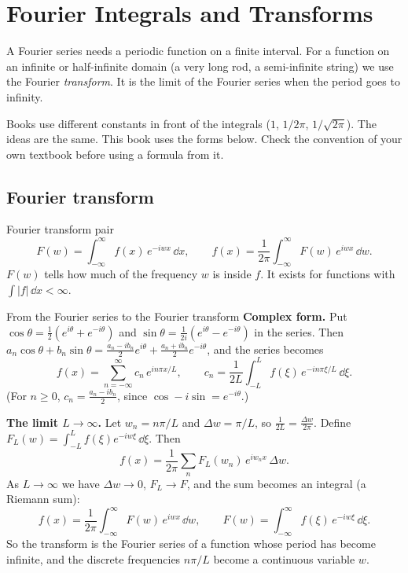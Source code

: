 \chapter{Fourier Integrals and Transforms}

A Fourier series needs a periodic function on a finite interval. For a function on an infinite or half-infinite domain (a very long rod, a semi-infinite string) we use the Fourier \emph{transform}. It is the limit of the Fourier series when the period goes to infinity.

\begin{notebox}
Books use different constants in front of the integrals ($1$, $1/2\pi$, $1/\sqrt{2\pi}$). The ideas are the same. This book uses the forms below. Check the convention of your own textbook before using a formula from it.
\end{notebox}

\section{Fourier transform}

\begin{defbox}{Fourier transform pair}
\[ F(w) = \int_{-\infty}^{\infty}f(x)\,e^{-iwx}\,\dd x, \qquad f(x) = \frac{1}{2\pi}\int_{-\infty}^{\infty}F(w)\,e^{iwx}\,\dd w. \]
$F(w)$ tells how much of the frequency $w$ is inside $f$. It exists for functions with $\int|f|\,\dd x<\infty$.
\end{defbox}

\begin{derivbox}{From the Fourier series to the Fourier transform}
\textbf{Complex form.} Put $\cos\theta = \frac12(e^{i\theta}+e^{-i\theta})$ and $\sin\theta = \frac1{2i}(e^{i\theta}-e^{-i\theta})$ in the series. Then $a_n\cos\theta + b_n\sin\theta = \frac{a_n - ib_n}{2}e^{i\theta} + \frac{a_n+ib_n}{2}e^{-i\theta}$, and the series becomes
\[ f(x) = \sum_{n=-\infty}^{\infty}c_n\,e^{in\pi x/L},\qquad c_n = \frac1{2L}\int_{-L}^{L}f(\xi)\,e^{-in\pi\xi/L}\,\dd\xi . \]
(For $n\ge0$, $c_n = \frac{a_n - ib_n}{2}$, since $\cos - i\sin = e^{-i\theta}$.)

\textbf{The limit $L\to\infty$.} Let $w_n = n\pi/L$ and $\Delta w = \pi/L$, so $\frac1{2L} = \frac{\Delta w}{2\pi}$. Define $F_L(w) = \int_{-L}^{L}f(\xi)e^{-iw\xi}\,\dd\xi$. Then
\[ f(x) = \frac1{2\pi}\sum_{n}F_L(w_n)\,e^{iw_nx}\,\Delta w . \]
As $L\to\infty$ we have $\Delta w\to0$, $F_L\to F$, and the sum becomes an integral (a Riemann sum):
\[ f(x) = \frac1{2\pi}\int_{-\infty}^{\infty}F(w)\,e^{iwx}\,\dd w,\qquad F(w) = \int_{-\infty}^{\infty}f(\xi)\,e^{-iw\xi}\,\dd\xi . \]
So the transform is the Fourier series of a function whose period has become infinite, and the discrete frequencies $n\pi/L$ become a continuous variable $w$.
\end{derivbox}

